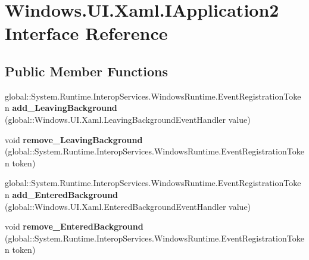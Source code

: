 \hypertarget{interface_windows_1_1_u_i_1_1_xaml_1_1_i_application2}{}\section{Windows.\+U\+I.\+Xaml.\+I\+Application2 Interface Reference}
\label{interface_windows_1_1_u_i_1_1_xaml_1_1_i_application2}
\subsection*{Public Member Functions}
\begin{DoxyCompactItemize}
\item 
\mbox{\label{interface_windows_1_1_u_i_1_1_xaml_1_1_i_application2_ae4e829ae4af3431cd39dbff079622f52}} 
global\+::\+System.\+Runtime.\+Interop\+Services.\+Windows\+Runtime.\+Event\+Registration\+Token {\bfseries add\+\_\+\+Leaving\+Background} (global\+::\+Windows.\+U\+I.\+Xaml.\+Leaving\+Background\+Event\+Handler value)
\item 
\mbox{\label{interface_windows_1_1_u_i_1_1_xaml_1_1_i_application2_a884312cad0a35622df0fc362403e4798}} 
void {\bfseries remove\+\_\+\+Leaving\+Background} (global\+::\+System.\+Runtime.\+Interop\+Services.\+Windows\+Runtime.\+Event\+Registration\+Token token)
\item 
\mbox{\label{interface_windows_1_1_u_i_1_1_xaml_1_1_i_application2_a0f800d5d5f7d3aef7f361e86183cd64b}} 
global\+::\+System.\+Runtime.\+Interop\+Services.\+Windows\+Runtime.\+Event\+Registration\+Token {\bfseries add\+\_\+\+Entered\+Background} (global\+::\+Windows.\+U\+I.\+Xaml.\+Entered\+Background\+Event\+Handler value)
\item 
\mbox{\label{interface_windows_1_1_u_i_1_1_xaml_1_1_i_application2_a7c5c73853965e2fd025af371c00a6c28}} 
void {\bfseries remove\+\_\+\+Entered\+Background} (global\+::\+System.\+Runtime.\+Interop\+Services.\+Windows\+Runtime.\+Event\+Registration\+Token token)
\item 
\mbox{\label{interface_windows_1_1_u_i_1_1_xaml_1_1_i_application2_ae4e829ae4af3431cd39dbff079622f52}} 

\end{DoxyCompactItemize}
